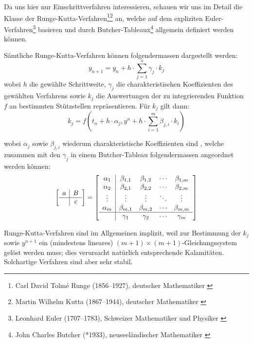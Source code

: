 \documentclass[11pt]{report} %
\theoremstyle{definition}
\begin{document}
Da uns hier nur Einschrittverfahren interessieren, schauen wir uns im Detail die Klasse der Runge-Kutta-Verfahren\footnote{Carl David Tolmé Runge (1856--1927), deutscher Mathematiker \cite{wiki:Runge}}\footnote{Martin Wilhelm Kutta (1867--1944), deutscher Mathematiker \cite{wiki:Kutta}} an, welche auf dem expliziten Euler-Verfahren\footnote{Leonhard Euler (1707--1783), Schweizer Mathematiker und Physiker \cite{wiki:Euler}} basieren und durch Butcher-Tableaux\footnote{John Charles Butcher (*1933), neuseeländischer Mathematiker \cite{wiki:Butcher}} allgemein definiert werden können.

Sämtliche Runge-Kutta-Verfahren können folgendermassen dargestellt werden:
\[
y_{n+1} = y_n + h\cdot \sum\limits_{j=1}^s \gamma_j \cdot k_j
\]
wobei $h$ die gewählte Schrittweite, $\gamma_j$ die charakteristischen Koeffizienten des gewählten Verfahrens sowie $k_j$ die Auswertungen der zu integrierenden Funktion $f$ an bestimmten Stützstellen repräsentieren. Für $k_j$ gilt dann:
\[
k_j = f\left(t_n + h\cdot\alpha_j, y^n + h\cdot \sum\limits_{i=1}^m \beta_{j,i}\cdot k_i \right)
\]

wobei $\alpha_j$ sowie $\beta_{j,i}$ wiederum charakteristische Koeffizienten sind \cite{Massjung, wiki:RungeKutta}, welche zusammen mit den $\gamma_j$ in einem Butcher-Tableau folgendermassen angeordnet werden können:
\[
\begin{bmatrix}
\begin{array}{c|c}
a & B\\
\hline     & c \\
\end{array}
\end{bmatrix} = \begin{bmatrix}
\begin{array}{c|cccc}
  \alpha_1    & \beta_{1,1} & \beta_{1,2}& \cdots & \beta_{1,m}\\
  \alpha_2    & \beta_{2,1} & \beta_{2,2}& \cdots & \beta_{2,m}\\
  \vdots & \vdots & \vdots& \ddots& \vdots\\
  \alpha_m    & \beta_{m,1} & \beta_{m,2}& \cdots & \beta_{m,m}\\
  \hline & \gamma_1    & \gamma_2   & \cdots & \gamma_m\\
\end{array}

\end{bmatrix}
\]

Runge-Kutta-Verfahren sind im Allgemeinen implizit, weil zur Bestimmung der $k_j$ sowie $y^{n+1}$ ein (mindestens lineares) $(m+1)\times(m+1)$-Gleichungssystem gelöst werden muss; dies verursacht natürlich entsprechende Kalamitäten. Solchartige Verfahren sind aber sehr stabil.\cite{Deuflhard}
\end{document}
